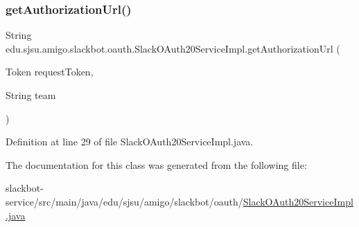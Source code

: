 \subsubsection{\texorpdfstring{get\+Authorization\+Url()}{getAuthorizationUrl()}}
{\footnotesize\ttfamily String edu.\+sjsu.\+amigo.\+slackbot.\+oauth.\+Slack\+O\+Auth20\+Service\+Impl.\+get\+Authorization\+Url (\begin{DoxyParamCaption}\item[{Token}]{request\+Token,  }\item[{String}]{team }\end{DoxyParamCaption})}



Definition at line 29 of file Slack\+O\+Auth20\+Service\+Impl.\+java.



The documentation for this class was generated from the following file\+:\begin{DoxyCompactItemize}
\item 
slackbot-\/service/src/main/java/edu/sjsu/amigo/slackbot/oauth/\hyperlink{_slack_o_auth20_service_impl_8java}{Slack\+O\+Auth20\+Service\+Impl.\+java}\end{DoxyCompactItemize}
